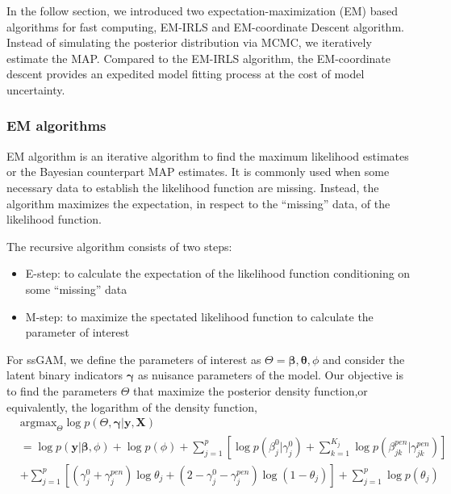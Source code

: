 \documentclass[AMA,STIX1COL,]{WileyNJD-v2}
\providecommand{\tightlist}{%
  \setlength{\itemsep}{0pt}\setlength{\parskip}{0pt}}
\begin{document}
In the follow section, we introduced two expectation-maximization (EM)
based algorithms for fast computing, EM-IRLS and EM-coordinate Descent
algorithm. Instead of simulating the posterior distribution via MCMC, we
iteratively estimate the MAP. Compared to the EM-IRLS algorithm, the
EM-coordinate descent provides an expedited model fitting process at the
cost of model uncertainty.

\hypertarget{em-algorithms}{%
\subsubsection{EM algorithms}\label{em-algorithms}}

EM algorithm is an iterative algorithm to find the maximum likelihood
estimates or the Bayesian counterpart MAP estimates. It is commonly used
when some necessary data to establish the likelihood function are
missing. Instead, the algorithm maximizes the expectation, in respect to
the ``missing'' data, of the likelihood function.

The recursive algorithm consists of two steps:

\begin{itemize}
\tightlist
\item
  E-step: to calculate the expectation of the likelihood function
  conditioning on some ``missing'' data
\item
  M-step: to maximize the spectated likelihood function to calculate the
  parameter of interest
\end{itemize}

For ssGAM, we define the parameters of interest as
\(\Theta = {\boldsymbol{\beta}, \boldsymbol{\theta}, \phi}\) and
consider the latent binary indicators \(\boldsymbol{\gamma}\) as
nuisance parameters of the model. Our objective is to find the
parameters \(\Theta\) that maximize the posterior density function,or
equivalently, the logarithm of the density function, \[
\begin{aligned}
& \text{argmax}_{\Theta}
\log p(\Theta, \boldsymbol{\gamma}| \textbf{y}, \textbf{X}) \\
&= \log p(\textbf{y}|\boldsymbol{\beta}, \phi) + \log p(\phi) + \sum\limits_{j=1}^p\left[\log p(\beta^0_j|\gamma^0_j)+\sum\limits_{k=1}^{K_j} \log p(\beta^{pen}_{jk}|\gamma^{pen}_{jk})\right]\\
& +\sum\limits_{j=1}^{p} \left[ (\gamma^0_j+\gamma_{j}^{pen})\log \theta_j + (2-\gamma^0_j-\gamma_{j}^{pen}) \log (1-\theta_j)\right] +  \sum\limits_{j=1}^{p}\log p(\theta_j)
\end{aligned}
\]\\
\end{document}
